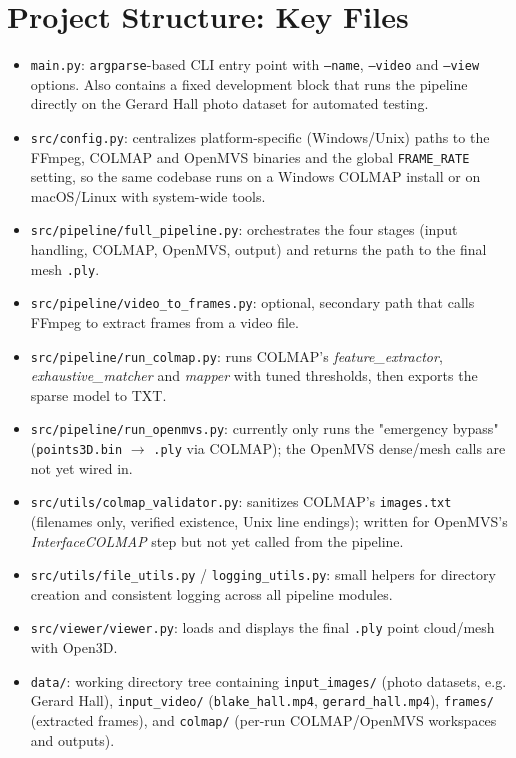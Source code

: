 \documentclass[11pt]{article}
\begin{document}
\section{Project Structure: Key Files}
\begin{itemize}[itemsep=1pt, topsep=2pt]
  \item \texttt{main.py}: \texttt{argparse}-based CLI entry point with
        \texttt{--name}, \texttt{--video} and \texttt{--view} options. Also
        contains a fixed development block that runs the pipeline directly
        on the Gerard Hall photo dataset for automated testing.
  \item \texttt{src/config.py}: centralizes platform-specific
        (Windows/Unix) paths to the FFmpeg, COLMAP and OpenMVS binaries and
        the global \texttt{FRAME\_RATE} setting, so the same codebase runs on
        a Windows COLMAP install or on macOS/Linux with system-wide tools.
  \item \texttt{src/pipeline/full\_pipeline.py}: orchestrates the four
        stages (input handling, COLMAP, OpenMVS, output) and returns the path
        to the final mesh \texttt{.ply}.
  \item \texttt{src/pipeline/video\_to\_frames.py}: optional, secondary
        path that calls FFmpeg to extract frames from a video file.
  \item \texttt{src/pipeline/run\_colmap.py}: runs COLMAP's
        \textit{feature\_extractor}, \textit{exhaustive\_matcher} and
        \textit{mapper} with tuned thresholds, then exports the sparse model
        to TXT.
  \item \texttt{src/pipeline/run\_openmvs.py}: currently only runs the
        "emergency bypass" (\texttt{points3D.bin} $\to$ \texttt{.ply} via
        COLMAP); the OpenMVS dense/mesh calls are not yet wired in.
  \item \texttt{src/utils/colmap\_validator.py}: sanitizes COLMAP's
        \texttt{images.txt} (filenames only, verified existence, Unix line
        endings); written for OpenMVS's \textit{InterfaceCOLMAP} step but not
        yet called from the pipeline.
  \item \texttt{src/utils/file\_utils.py} / \texttt{logging\_utils.py}:
        small helpers for directory creation and consistent logging across
        all pipeline modules.
  \item \texttt{src/viewer/viewer.py}: loads and displays the final
        \texttt{.ply} point cloud/mesh with Open3D.
  \item \texttt{data/}: working directory tree containing \texttt{input\_images/}
        (photo datasets, e.g. Gerard Hall), \texttt{input\_video/}
        (\texttt{blake\_hall.mp4}, \texttt{gerard\_hall.mp4}),
        \texttt{frames/} (extracted frames), and \texttt{colmap/} (per-run
        COLMAP/OpenMVS workspaces and outputs).
\end{itemize}
\end{document}
